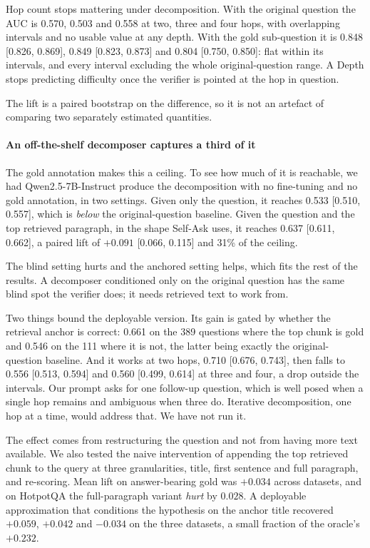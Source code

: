 \documentclass[conference]{IEEEtran}
\begin{document}
Hop count stops mattering under decomposition. With the original question the
AUC is 0.570, 0.503 and 0.558 at two, three and four hops, with overlapping
intervals and no usable value at any depth. With the gold sub-question it is
0.848 [0.826, 0.869], 0.849 [0.823, 0.873] and 0.804 [0.750, 0.850]: flat within
its intervals, and every interval excluding the whole original-question range. A
Depth stops predicting difficulty once the verifier is pointed at the hop in
question.

The lift is a paired bootstrap on the difference, so it is not an artefact of
comparing two separately estimated quantities.

\paragraph{An off-the-shelf decomposer captures a third of it}
The gold annotation makes this a ceiling. To see how much of it is reachable, we
had Qwen2.5-7B-Instruct produce the decomposition with no fine-tuning and no
gold annotation, in two settings. Given only the question, it reaches 0.533
[0.510, 0.557], which is \emph{below} the original-question baseline. Given the
question and the top retrieved paragraph, in the shape Self-Ask uses, it reaches
0.637 [0.611, 0.662], a paired lift of $+0.091$ [0.066, 0.115] and 31\% of the
ceiling.

The blind setting hurts and the anchored setting helps, which fits
the rest of the results. A decomposer conditioned only on the original question
has the same blind spot the verifier does; it needs retrieved text to work from.

Two things bound the deployable version. Its gain is gated by whether the
retrieval anchor is correct: 0.661 on the 389 questions where the top chunk is
gold and 0.546 on the 111 where it is not, the latter being exactly the
original-question baseline. And it works at two hops, 0.710 [0.676, 0.743], then
falls to 0.556 [0.513, 0.594] and 0.560 [0.499, 0.614] at three and four, a drop
outside the intervals. Our prompt asks for one follow-up question, which is well
posed when a single hop remains and ambiguous when three do. Iterative
decomposition, one hop at a time, would address that. We have not run it.

The effect comes from restructuring the question and not from having more text
available. We also tested the naive intervention of appending the top retrieved
chunk to the query at three granularities, title, first sentence and full
paragraph, and re-scoring. Mean lift on answer-bearing gold was $+0.034$ across
datasets, and on HotpotQA the full-paragraph variant \emph{hurt} by $0.028$. A
deployable approximation that conditions the hypothesis on the anchor title
recovered $+0.059$, $+0.042$ and $-0.034$ on the three datasets, a small
fraction of the oracle's $+0.232$.
\end{document}
